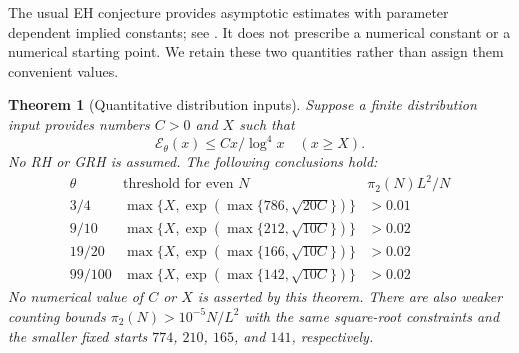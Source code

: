 \documentclass[11pt]{article}
\newtheorem{theorem}{Theorem}
\begin{document}
The usual EH conjecture provides asymptotic estimates with parameter
dependent implied constants; see \cite[Claim 2.2]{Polymath}. It does
not prescribe a numerical constant or a numerical starting point.
We retain these two quantities rather than assign them convenient values.

\begin{theorem}[Quantitative distribution inputs]\label{prop:EH}
Suppose a finite distribution input provides numbers $C>0$ and $X$
such that
\begin{equation}\label{eq:EHinput}
\mathcal E_\theta(x)\le Cx/\log^4x\quad(x\ge X).
\end{equation}
No RH or GRH is assumed. The following conclusions hold:
\[
\begin{array}{c|c|c}
\theta & \text{threshold for even }N & \pi_2(N)L^2/N\\\hline
3/4 & \max\{X,\exp(\max\{786,\sqrt{20C}\})\} & >0.01\\
9/10 & \max\{X,\exp(\max\{212,\sqrt{10C}\})\} & >0.02\\
19/20 & \max\{X,\exp(\max\{166,\sqrt{10C}\})\} & >0.02\\
99/100 & \max\{X,\exp(\max\{142,\sqrt{10C}\})\} & >0.02
\end{array}
\]
No numerical value of $C$ or $X$ is asserted by this theorem.
There are also weaker counting bounds
$\pi_2(N)>10^{-5}N/L^2$ with the same square-root constraints and
the smaller fixed starts $774$, $210$, $165$, and $141$, respectively.
\end{theorem}
\end{document}
